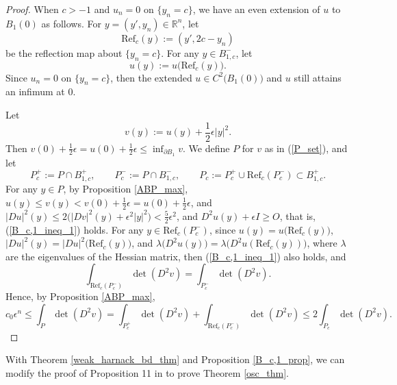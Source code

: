 \documentclass[12pt]{amsart}
\theoremstyle{definition}
\theoremstyle{remark}
\numberwithin{equation}{section}
\begin{document}
\begin{proof}	
	When $c > -1$ and $u_n = 0$ on $\{ y_n = c\}$, we have an even extension of $u$ to $B_1(0)$ as follows.
	For $y = (y', y_n) \in \mathbb{R}^n$, let
	$$\text{Ref}_c (y) := (y', 2c - y_n)$$
	be the reflection map about $\{ y_n = c \}$. For any $y \in B_{1,c}^-$, let
	$$u(y) := u\big(\text{Ref}_c (y)\big).$$
	Since $u_n = 0$ on $\{ y_n = c\}$, then the extended $u \in C^2 \big(B_1(0)\big)$ and $u$ still attains an infimum at $0$.
	
	Let $$v(y) := u(y) + \frac{1}{2} \epsilon |y|^2.$$
	Then $v(0) + \frac{1}{2}\epsilon = u(0) + \frac{1}{2}\epsilon \leq \inf_{\partial B_1} v$.
	We define $P$ for $v$ as in (\ref{P_set}), and
	let $$P_c^+ := P \cap B_{1,c}^+, \qquad P_c^- := P \cap B_{1,c}^-, \qquad P_c := P_c^+ \cup \text{Ref}_c (P_c^-)\subset B_{1,c}^+.$$
	For any $y\in P$, by Proposition \ref{ABP_max}, $u(y) \leq v(y) < v(0) + \frac{1}{2}\epsilon = u(0) + \frac{1}{2}\epsilon$, and $|Du|^2(y) \leq 2 \big(|Dv|^2(y) + \epsilon^2 |y|^2\big) < \frac{5}{2} \epsilon^2 $, and $D^2 u(y) + \epsilon I \geq O$, that is, (\ref{B_c,1_ineq_1}) holds. 
	For any $y \in \text{Ref}_c (P_c^-)$, since $u(y) = u\big(\text{Ref}_c (y)\big)$, $|Du|^2(y) = |Du|^2\big(\text{Ref}_c(y)\big)$, and $\lambda\big(D^2 u (y)\big) = \lambda\big(D^2 u (\text{Ref}_c (y))\big)$, where $\lambda$ are the eigenvalues of the Hessian matrix, then (\ref{B_c,1_ineq_1}) also holds, and
	\begin{equation}
	\int_{\text{Ref}_c (P_c^-)} \det (D^2 v) = \int_{P_c^-} \det (D^2 v).
	\end{equation}
	Hence, by Proposition \ref{ABP_max}, 
	\begin{equation}
	c_0 \epsilon^n \leq \int_{P} \det (D^2 v) = \int_{P_c^+} \det (D^2 v) + \int_{\text{Ref}_c (P_c^-)} \det (D^2 v) \leq 2 \int_{P_c} \det (D^2 v).
	\end{equation}
\end{proof}


With Theorem \ref{weak_harnack_bd_thm} and Proposition \ref{B_c,1_prop}, we can modify the proof of Proposition 11 in \cite{Sze15} to prove Theorem \ref{osc_thm}.
\end{document}

